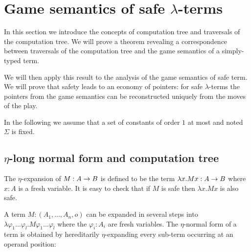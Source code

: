 \def\cmptre#1{\tau(#1)}
\def\aux#1{\lceil #1\rceil}
\def\nf#1{\eta_{\sf nf}(#1)}

\section{Game semantics of safe $\lambda$-terms}

In this section we introduce the concepts of computation tree and
traversals of the computation tree. We will prove a theorem
revealing a correspondence between traversals of the computation
tree and the game semantics of a simply-typed term.

We will then apply this result to the analysis of the game semantics
of safe term. We will prove that safety leads to an economy of
pointers: for safe $\lambda$-terms the pointers from the game
semantics can be reconstructed uniquely from the moves of the play.

In the following we assume that a set of constants of order $1$ at
most and noted $\Sigma$ is fixed.
%
%

\subsection{$\eta$-long normal form and computation tree}

The $\eta$-expansion of $M: A\rightarrow B$ is defined to be the term $\lambda x . M x : A\rightarrow B$ where $x:A$ is a fresh variable.
It is easy to check that if $M$ is safe then $\lambda x . M x$ is also safe.

A term $M : (A_1,\ldots,A_n,o)$ can be expanded in several steps
into $\lambda \varphi_1 \ldots \varphi_l . M \varphi_1 \ldots
\varphi_l$ where the $\varphi_i:A_i$ are fresh variables. The
$\eta$-normal form of a term is obtained by hereditarily
$\eta$-expanding every sub-term occurring at an operand position:

